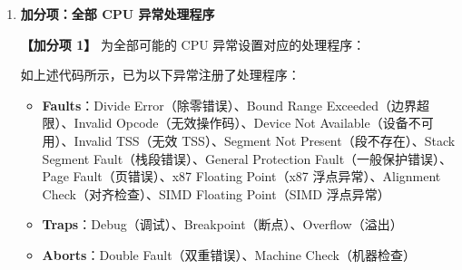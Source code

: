 \documentclass{SYSUReport}
\begin{document}
\begin{enumerate}[label={\chinese*、},labelsep=0pt, start=2]
\begin{verbatim}
    // Traps
    idt.debug.set_handler_fn(debug_handler);
    idt.breakpoint.set_handler_fn(breakpoint_handler);
    idt.overflow.set_handler_fn(overflow_handler);

    // Aborts
    unsafe {
        idt.double_fault
        .set_handler_fn(double_fault_handler)
        .set_stack_index(gdt::DOUBLE_FAULT_IST_INDEX);
    }
    idt.machine_check.set_handler_fn(machine_check_handler);
}
    \end{verbatim}

    这里需要注意，Page Fault 和 Double Fault 的处理程序通过 \texttt{set\_stack\_index} 指定了独立的 IST 栈。这是因为这两种异常可能在系统状态已经受损的情况下发生，使用独立栈可以确保处理程序有足够的栈空间执行。

    中断处理函数使用 \texttt{extern "x86-interrupt"} 调用约定声明。这个调用约定是 Rust 专门为 x86 中断处理提供的，它会自动处理中断栈帧的保存和恢复，以及在中断返回时执行 \texttt{iretq} 指令。

    \begin{verbatim}
pub extern "x86-interrupt" fn divide_error_handler(stack_frame: InterruptStackFrame) {
    panic!("EXCEPTION: DIVIDE ERROR\n\n{:#?}", stack_frame);
}

pub extern "x86-interrupt" fn page_fault_handler(
    stack_frame: InterruptStackFrame,
    err_code: PageFaultErrorCode,
) {
    panic!(
        "EXCEPTION: PAGE FAULT, ERROR_CODE: {:?}\n\nTrying to access: {:#x}\n{:#?}",
        err_code,
        Cr2::read().unwrap_or(VirtAddr::new_truncate(0xdeadbeef)),
        stack_frame
    );
}
    \end{verbatim}

    Page Fault 处理程序会读取 Cr2 寄存器，该寄存器保存了导致 Page Fault 的虚拟地址。这对于调试非常有用，可以快速定位问题所在。

    \item \textbf{加分项：全部 CPU 异常处理程序}

    \textbf{【加分项 1】} 为全部可能的 CPU 异常设置对应的处理程序：

    如上述代码所示，已为以下异常注册了处理程序：
    \begin{itemize}
        \item \textbf{Faults}：Divide Error（除零错误）、Bound Range Exceeded（边界超限）、Invalid Opcode（无效操作码）、Device Not Available（设备不可用）、Invalid TSS（无效 TSS）、Segment Not Present（段不存在）、Stack Segment Fault（栈段错误）、General Protection Fault（一般保护错误）、Page Fault（页错误）、x87 Floating Point（x87 浮点异常）、Alignment Check（对齐检查）、SIMD Floating Point（SIMD 浮点异常）
        \item \textbf{Traps}：Debug（调试）、Breakpoint（断点）、Overflow（溢出）
        \item \textbf{Aborts}：Double Fault（双重错误）、Machine Check（机器检查）
    \end{itemize}


\end{enumerate}
\end{document}
